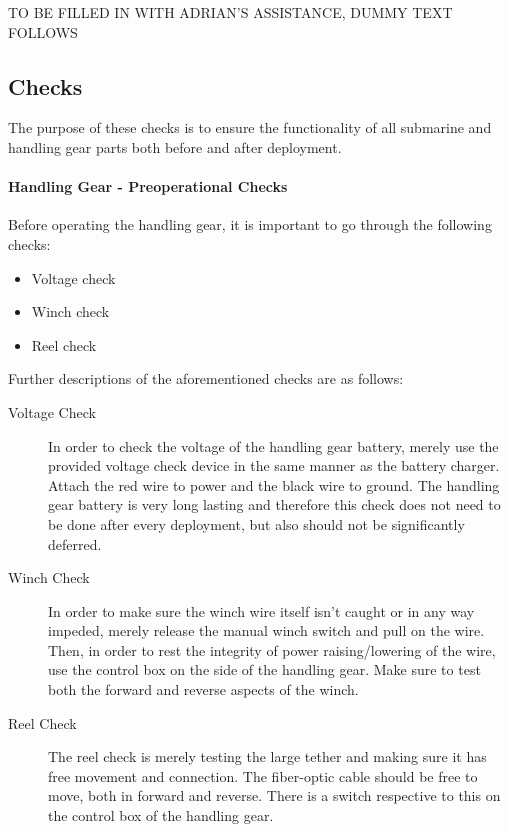 \documentclass[
10pt, %
a4paper, %
oneside, %
headinclude,footinclude, %
BCOR5mm, %
]{scrartcl}
\begin{document}
TO BE FILLED IN WITH ADRIAN'S ASSISTANCE, DUMMY TEXT FOLLOWS




\subsection{Checks}

The purpose of these checks is to ensure the functionality of all submarine and handling gear parts both before and after deployment.

\paragraph{Handling Gear - Preoperational Checks} Before operating the handling gear, it is important to go through the following checks:

\begin{itemize}[noitemsep] %
	\item Voltage check
	\item Winch check
	\item Reel check
	
\end{itemize}
Further descriptions of the aforementioned checks are as follows:

\begin{description}
	\item[Voltage Check] In order to check the voltage of the handling gear battery, merely use the provided voltage check device in the same manner as the battery charger. Attach the red wire to power and the black wire to ground. The handling gear battery is very long lasting and therefore this check does not need to be done after every deployment, but also should not be significantly deferred.
	\item[Winch Check] In order to make sure the winch wire itself isn't caught or in any way impeded, merely release the manual winch switch and pull on the wire. Then, in order to rest the integrity of power raising/lowering of the wire, use the control box on the side of the handling gear. Make sure to test both the forward and reverse aspects of the winch. 
	\item[Reel Check] The reel check is merely testing the large tether and making sure it has free movement and connection. The fiber-optic cable should be free to move, both in forward and reverse. There is a switch respective to this on the control box of the handling gear.
\end{description}
\end{document}
